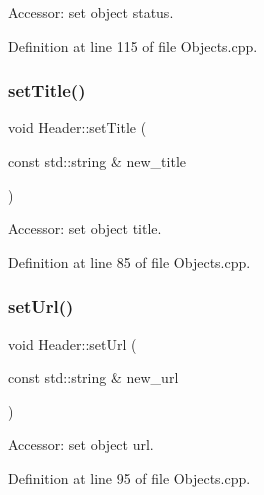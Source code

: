 Accessor\+: set object status. 



Definition at line 115 of file Objects.\+cpp.

\hypertarget{class_d_d4hep_1_1_geometry_1_1_header_a5e718143f204d4c58721e145772b896c}{}\label{class_d_d4hep_1_1_geometry_1_1_header_a5e718143f204d4c58721e145772b896c} 
\subsubsection{\texorpdfstring{set\+Title()}{setTitle()}}
{\footnotesize\ttfamily void Header\+::set\+Title (\begin{DoxyParamCaption}\item[{const std\+::string \&}]{new\+\_\+title }\end{DoxyParamCaption})}



Accessor\+: set object title. 



Definition at line 85 of file Objects.\+cpp.

\hypertarget{class_d_d4hep_1_1_geometry_1_1_header_ae7931709b0b3f36f483c4849d5022b38}{}\label{class_d_d4hep_1_1_geometry_1_1_header_ae7931709b0b3f36f483c4849d5022b38} 
\subsubsection{\texorpdfstring{set\+Url()}{setUrl()}}
{\footnotesize\ttfamily void Header\+::set\+Url (\begin{DoxyParamCaption}\item[{const std\+::string \&}]{new\+\_\+url }\end{DoxyParamCaption})}



Accessor\+: set object url. 



Definition at line 95 of file Objects.\+cpp.

\hypertarget{class_d_d4hep_1_1_geometry_1_1_header_a33ab2e124d5c8f3f2d3f05a50be4bdad}{}\label{class_d_d4hep_1_1_geometry_1_1_header_a33ab2e124d5c8f3f2d3f05a50be4bdad} 
